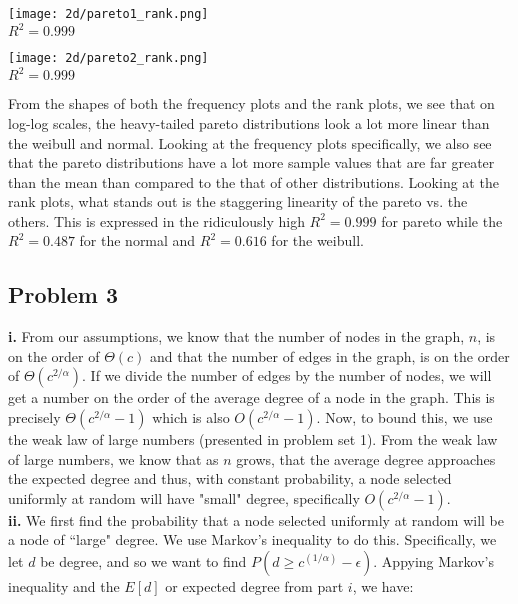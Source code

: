 \documentclass[12 pt]{article}
\begin{document}
	\begin{center}
		\texttt{[image: 2d/pareto1\_rank.png]}\\
		$R^2 = 0.999$\\
	\end{center}
	
	\begin{center}
		\texttt{[image: 2d/pareto2\_rank.png]} \\
		$R^2 = 0.999$\\
	\end{center}
	
	\noindent From the shapes of both the frequency plots and the rank plots, we see that on log-log scales, the heavy-tailed pareto distributions look a lot more linear than the weibull and normal. Looking at the frequency plots specifically, we also see that the pareto distributions have a lot more sample values that are far greater than the mean than compared to the that of other distributions. Looking at the rank plots, what stands out is the staggering linearity of the pareto vs. the others. This is expressed in the ridiculously high $R^2 = 0.999$ for pareto while the $R^2 = 0.487$ for the normal and $R^2 = 0.616$ for the weibull.\\
	
	
	\subsection*{Problem 3}
	\noindent \textbf{i.} From our assumptions, we know that the number of nodes in the graph, $n$, is on the order of $\Theta(c)$ and that the number of edges in the graph, is on the order of $\Theta(c^{2/\alpha})$. If we divide the number of edges by the number of nodes, we will get a number on the order of the average degree of a node in the graph. This is precisely $\Theta(c^{2/\alpha} - 1)$ which is also $O(c^{2/\alpha} - 1)$. Now, to bound this, we use the weak law of large numbers (presented in problem set 1). From the weak law of large numbers, we know that as $n$ grows, that the average degree approaches the expected degree and thus, with constant probability, a node selected uniformly at random will have "small" degree, specifically $O(c^{2/\alpha} - 1)$. \\
	
	\noindent \textbf{ii.} We first find the probability that a node selected uniformly at random will be a node of ``large" degree. We use Markov's inequality to do this. Specifically, we let $d$ be degree, and so we want to find $P(d \geq c^{(1/\alpha)}-\epsilon)$. Appying Markov's inequality and the $E[d]$ or expected degree from part $i$, we have:
	
\end{document}
